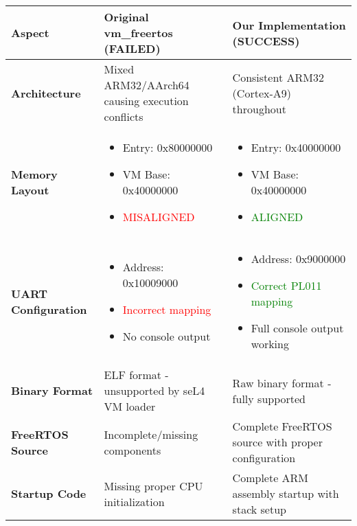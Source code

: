 \documentclass[12pt]{article}
\begin{document}
\begin{longtable}{@{}p{3cm}|p{5cm}|p{5cm}@{}}
\toprule
\textbf{Aspect} & \cellcolor{red!20}\textbf{Original vm\_freertos (FAILED)} & \cellcolor{green!20}\textbf{Our Implementation (SUCCESS)} \\
\midrule
\endhead

\textbf{Architecture} & 
Mixed ARM32/AArch64 causing execution conflicts &
Consistent ARM32 (Cortex-A9) throughout \\
\midrule

\textbf{Memory Layout} & 
\begin{itemize}
\item Entry: 0x80000000
\item VM Base: 0x40000000  
\item \textcolor{red}{MISALIGNED}
\end{itemize} &
\begin{itemize}
\item Entry: 0x40000000
\item VM Base: 0x40000000
\item \textcolor{green}{ALIGNED}
\end{itemize} \\
\midrule

\textbf{UART Configuration} &
\begin{itemize}
\item Address: 0x10009000
\item \textcolor{red}{Incorrect mapping}
\item No console output
\end{itemize} &
\begin{itemize}
\item Address: 0x9000000  
\item \textcolor{green}{Correct PL011 mapping}
\item Full console output working
\end{itemize} \\
\midrule

\textbf{Binary Format} &
ELF format - unsupported by seL4 VM loader &
Raw binary format - fully supported \\
\midrule

\textbf{FreeRTOS Source} &
Incomplete/missing components &
Complete FreeRTOS source with proper configuration \\
\midrule

\textbf{Startup Code} &
Missing proper CPU initialization &
Complete ARM assembly startup with stack setup \\
\midrule


\end{longtable}
\end{document}
